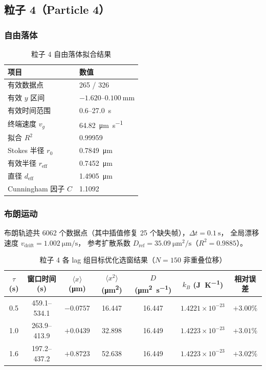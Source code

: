 \documentclass[12pt,a4paper]{ctexart}
\begin{document}
\clearpage
\subsection{粒子 4（Particle 4）}

\subsubsection{自由落体}

\begin{table}[h]
\centering
\caption{粒子 4 自由落体拟合结果}
\label{tab:p4_freefall}
\begin{tabular}{ll}
\toprule
项目 & 数值 \\
\midrule
有效数据点 & 265 / 326 \\
有效 $y$ 区间 & $-1.620$--$\SI{0.100}{\milli\metre}$ \\
有效时间范围 & 0.6--\SI{27.0}{\second} \\
终端速度 $v_g$ & \SI{64.82}{\micro\metre\per\second} \\
拟合 $R^2$ & 0.99959 \\
Stokes 半径 $r_0$ & \SI{0.7849}{\micro\metre} \\
有效半径 $r_\text{eff}$ & \SI{0.7452}{\micro\metre} \\
直径 $d_\text{eff}$ & \SI{1.4905}{\micro\metre} \\
Cunningham 因子 $C$ & 1.1092 \\
\bottomrule
\end{tabular}
\end{table}

\subsubsection{布朗运动}

布朗轨迹共 6062 个数据点（其中插值修复 25 个缺失帧），$\Delta t = \SI{0.1}{\second}$，
全局漂移速度 $v_\text{drift} = \SI{1.002}{\micro\metre\per\second}$，
参考扩散系数 $D_\text{ref} = \SI{35.09}{\micro\metre^2\per\second}$（$R^2 = 0.9885$）。

\begin{table}[h]
\centering
\caption{粒子 4 各 lag 组目标优化选窗结果（$N=150$ 非重叠位移）}
\label{tab:p4_results}
\begin{tabular}{ccccccc}
\toprule
$\tau$ (s) & 窗口时间 (s) & $\langle x\rangle$ (\si{\micro\metre}) & $\langle x^2\rangle$ (\si{\micro\metre^2}) & $D$ (\si{\micro\metre^2\per\second}) & $k_B$ (\si{\joule\per\kelvin}) & 相对误差 \\
\midrule
0.5 & 459.1--534.1 & $-0.0757$ & 16.447 & 16.447 & $1.4221\times10^{-23}$ & $+3.00\%$ \\
1.0 & 263.9--413.9 & $+0.0439$ & 32.898 & 16.449 & $1.4223\times10^{-23}$ & $+3.01\%$ \\
1.6 & 197.2--437.2 & $+0.8723$ & 52.638 & 16.449 & $1.4223\times10^{-23}$ & $+3.02\%$ \\
\bottomrule
\end{tabular}
\end{table}
\end{document}
